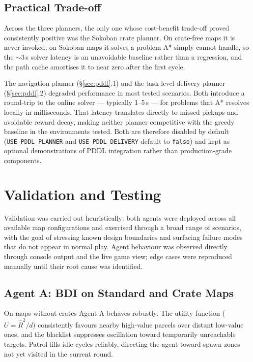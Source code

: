 \documentclass[10pt,a4paper,twocolumn]{article}
\begin{document}
\subsection{Practical Trade-off}

Across the three planners, the only one whose cost-benefit trade-off proved
consistently positive was the Sokoban crate planner.  On crate-free maps it
is never invoked; on Sokoban maps it solves a problem A* simply cannot handle,
so the $\sim$3\,s solver latency is an unavoidable baseline rather than a
regression, and the path cache amortises it to near zero after the first cycle.

The navigation planner (\S\ref{sec:pddl}.1) and the task-level delivery planner
(\S\ref{sec:pddl}.2) degraded performance in most tested scenarios.  Both
introduce a round-trip to the online solver — typically 1--5\,s — for problems
that A* resolves locally in milliseconds.  That latency translates directly to
missed pickups and avoidable reward decay, making neither planner competitive
with the greedy baseline in the environments tested.  Both are therefore disabled
by default (\texttt{USE\_PDDL\_PLANNER} and \texttt{USE\_PDDL\_DELIVERY} default
to \texttt{false}) and kept as optional demonstrations of PDDL integration rather
than production-grade components.

\section{Validation and Testing}
\label{sec:validation}

Validation was carried out heuristically: both agents were deployed across
all available map configurations and exercised through a broad range of
scenarios, with the goal of stressing known design boundaries and
surfacing failure modes that do not appear in normal play.  Agent
behaviour was observed directly through console output and the live game
view; edge cases were reproduced manually until their root cause was
identified.

\subsection{Agent A: BDI on Standard and Crate Maps}

On maps without crates Agent A behaves robustly.  The utility function
($U = \hat{R}^2/d$) consistently favours nearby high-value parcels over
distant low-value ones, and the blacklist suppresses oscillation toward
temporarily unreachable targets.  Patrol fills idle cycles reliably,
directing the agent toward spawn zones not yet visited in the current round.
\end{document}
